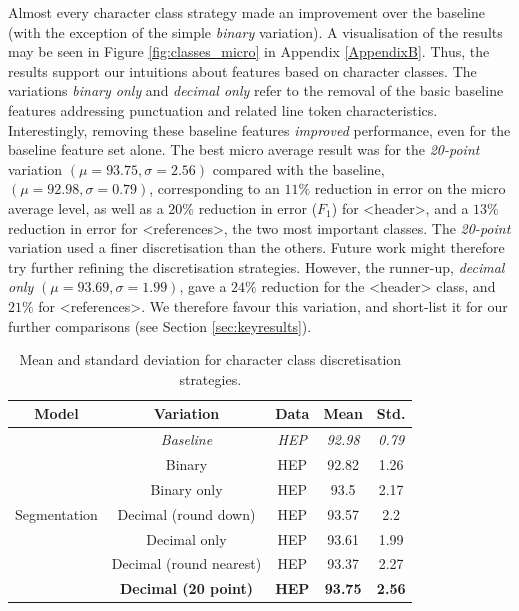 Almost every character class strategy made an improvement over the baseline (with the exception of the simple \emph{binary} variation). A visualisation of the results may be seen in Figure \ref{fig:classes_micro} in Appendix \ref{AppendixB}. Thus, the results support our intuitions about features based on character classes. The variations \emph{binary only} and \emph{decimal only} refer to the removal of the basic baseline features addressing punctuation and related line token characteristics. Interestingly, removing these baseline features \emph{improved} performance, even for the baseline feature set alone. The best micro average result was for the \emph{20-point} variation $(\mu = 93.75, \sigma = 2.56)$ compared with the baseline, $(\mu = 92.98, \sigma = 0.79)$, corresponding to an $11\%$ reduction in error on the micro average level, as well as a $20\%$ reduction in error ($F_1$) for <header>, and a $13\%$ reduction in error for <references>, the two most important classes. The \emph{20-point} variation used a finer discretisation than the others. Future work might therefore try further refining the discretisation strategies. However, the runner-up, \emph{decimal only} $(\mu = 93.69, \sigma = 1.99)$, gave a $24\%$ reduction for the <header> class, and $21\%$ for <references>. We therefore favour this variation, and short-list it for our further comparisons (see Section \ref{sec:keyresults}).

\begin{table}[h]
\begin{center}
\begin{tabular}{|c|c|c|c|c|}
\hline
Model & Variation & Data & Mean & Std.\\
\hline
\multirow{7}{*}{Segmentation} & \emph{Baseline} & \emph{HEP} & \emph{92.98} & \emph{0.79} \\\cline{2-5}
& Binary & HEP & 92.82 & 1.26\\\cline{2-5}
& Binary only & HEP & 93.5 & 2.17\\\cline{2-5}
& Decimal (round down) & HEP & 93.57 & 2.2\\\cline{2-5}
& Decimal only & HEP & 93.61 & 1.99\\\cline{2-5}
& Decimal (round nearest) & HEP & 93.37 & 2.27\\\cline{2-5}
& \textbf{Decimal (20 point)} & \textbf{HEP} & \textbf{93.75} & \textbf{2.56}\\\cline{2-5}
\hline
\end{tabular}
\caption{Mean and standard deviation for character class discretisation strategies.}
\label{table:characterclassresults}
\end{center}
\end{table}

